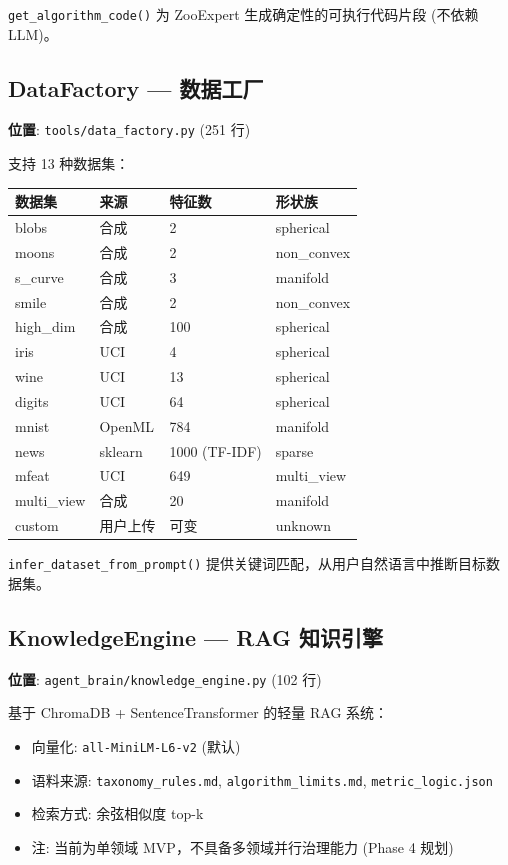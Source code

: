 \documentclass[12pt,a4paper]{article}
\begin{document}
\texttt{get\_algorithm\_code()} 为 ZooExpert 生成确定性的可执行代码片段 (不依赖 LLM)。

\subsection{DataFactory --- 数据工厂}

\textbf{位置}: \texttt{tools/data\_factory.py} (251 行)

支持 13 种数据集：

\begin{table}[H]
\centering
\begin{tabular}{@{}llll@{}}
\toprule
\textbf{数据集} & \textbf{来源} & \textbf{特征数} & \textbf{形状族} \\
\midrule
blobs & 合成 & 2 & spherical \\
moons & 合成 & 2 & non\_convex \\
s\_curve & 合成 & 3 & manifold \\
smile & 合成 & 2 & non\_convex \\
high\_dim & 合成 & 100 & spherical \\
iris & UCI & 4 & spherical \\
wine & UCI & 13 & spherical \\
digits & UCI & 64 & spherical \\
mnist & OpenML & 784 & manifold \\
news & sklearn & 1000 (TF-IDF) & sparse \\
mfeat & UCI & 649 & multi\_view \\
multi\_view & 合成 & 20 & manifold \\
custom & 用户上传 & 可变 & unknown \\
\bottomrule
\end{tabular}
\end{table}

\texttt{infer\_dataset\_from\_prompt()} 提供关键词匹配，从用户自然语言中推断目标数据集。

\subsection{KnowledgeEngine --- RAG 知识引擎}

\textbf{位置}: \texttt{agent\_brain/knowledge\_engine.py} (102 行)

基于 ChromaDB + SentenceTransformer 的轻量 RAG 系统：
\begin{itemize}[nosep]
    \item 向量化: \texttt{all-MiniLM-L6-v2} (默认)
    \item 语料来源: \texttt{taxonomy\_rules.md}, \texttt{algorithm\_limits.md}, \texttt{metric\_logic.json}
    \item 检索方式: 余弦相似度 top-k
    \item 注: 当前为单领域 MVP，不具备多领域并行治理能力 (Phase 4 规划)
\end{itemize}
\end{document}
